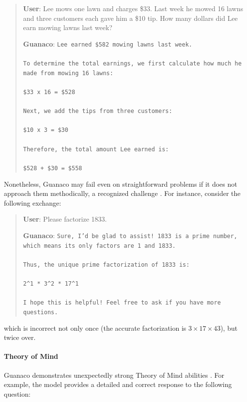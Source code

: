 \begin{quote}
    \textbf{User}: Lee mows one lawn and charges \$33. Last week he mowed 16 lawns and three customers each gave him a \$10 tip. How many dollars did Lee earn mowing lawns last week?

    \textbf{Guanaco}: \texttt{Lee earned \$582 mowing lawns last week. \\ \\ To determine the total earnings, we first calculate how much he made from mowing 16 lawns: \\ \\  \$33 x 16 = \$528 \\ \\ Next, we add the tips from three customers: \\  \\ \$10 x 3 = \$30 \\ \\ Therefore, the total amount Lee earned is: \\ \\ \$528 + \$30 = \$558}
\end{quote}

Nonetheless, {Guanaco} may fail even on straightforward problems if it does not approach them methodically, a recognized challenge \cite{weichain}. For instance, consider the following exchange:

\begin{quote}
    \textbf{User}: Please factorize 1833.

    \textbf{Guanaco}: \texttt{Sure, I'd be glad to assist! 1833 is a prime number, which means its only factors are 1 and 1833. \\ \\ Thus, the unique prime factorization of 1833 is: \\ \\ 2\^{}1 * 3\^{}2 * 17\^{}1 \\ \\ I hope this is helpful! Feel free to ask if you have more questions.}
\end{quote}

which is incorrect not only once (the accurate factorization is $3 \times 17 \times 43$), but twice over.

\paragraph{Theory of Mind} {Guanaco} demonstrates unexpectedly strong Theory of Mind abilities \cite{nematzadeh2018evaluating, sap2022neural}. For example, the model provides a detailed and correct response to the following question:

